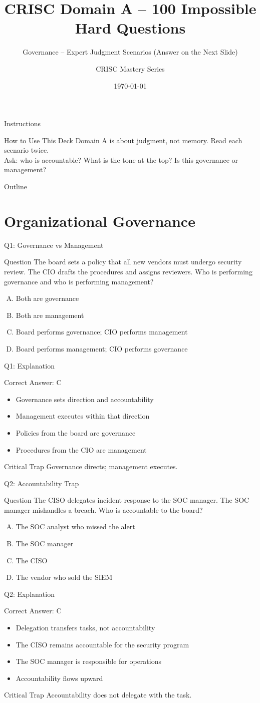 \documentclass[aspectratio=169]{beamer}
\title{CRISC Domain A -- 100 Impossible Hard Questions}
\subtitle{Governance -- Expert Judgment Scenarios (Answer on the Next Slide)}
\author{CRISC Mastery Series}
\date{\today}
\newcommand{\hq}[7]{%
	\begin{frame}{Q#1: #2}
		\begin{block}{Question}
			#3
		\end{block}
		\begin{enumerate}[(A)]
			#4
		\end{enumerate}
	\end{frame}
	\begin{frame}{Q#1: Explanation}
		\begin{block}{Correct Answer: #5}
			\begin{itemize}
				#6
			\end{itemize}
		\end{block}
		\begin{alertblock}{Critical Trap}
			#7
		\end{alertblock}
	\end{frame}
}
\begin{document}
	
	\begin{frame}\titlepage\end{frame}
	
	\begin{frame}{Instructions}
		\begin{alertblock}{How to Use This Deck}
			Domain A is about judgment, not memory. Read each scenario twice.\\
			Ask: who is accountable? What is the tone at the top? Is this governance or management?
		\end{alertblock}
	\end{frame}
	
	\begin{frame}{Outline}
		\tableofcontents
	\end{frame}
	
	\section{Organizational Governance}
	
	\hq{1}{Governance vs Management}
	{The board sets a policy that all new vendors must undergo security review. The CIO drafts the procedures and assigns reviewers. Who is performing governance and who is performing management?}
	{\item Both are governance
		\item Both are management
		\item Board performs governance; CIO performs management
		\item Board performs management; CIO performs governance}
	{C}
	{\item Governance sets direction and accountability
		\item Management executes within that direction
		\item Policies from the board are governance
		\item Procedures from the CIO are management}
	{Governance directs; management executes.}
	
	\hq{2}{Accountability Trap}
	{The CISO delegates incident response to the SOC manager. The SOC manager mishandles a breach. Who is accountable to the board?}
	{\item The SOC analyst who missed the alert
		\item The SOC manager
		\item The CISO
		\item The vendor who sold the SIEM}
	{C}
	{\item Delegation transfers tasks, not accountability
		\item The CISO remains accountable for the security program
		\item The SOC manager is responsible for operations
		\item Accountability flows upward}
	{Accountability does not delegate with the task.}
	
\end{document}
